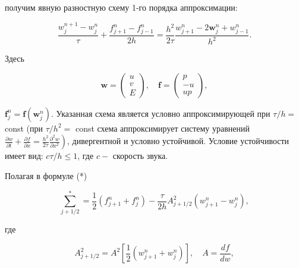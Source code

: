 \documentclass[10pt]{article}
\begin{document}
получим явную разностную схему 1-го порядка аппроксимации:



\[

\frac{w_{j}^{n+1}-w_{j}^{n}}{\tau}+\frac{f_{j+1}^{n}-f_{j-1}^{n}}{2 h}=\frac{h^{2}}{2 \tau} \frac{w_{j+1}^{n}-2 \boldsymbol{w}_{j}^{n}+w_{j-1}^{n}}{h^{2}} .

\]



Здесь



\[

\boldsymbol{w}=\left(\begin{array}{c}

u \\

v \\

E

\end{array}\right), \quad \boldsymbol{f}=\left(\begin{array}{c}

p \\

-u \\

u p

\end{array}\right),

\]



$\boldsymbol{f}_{j}^{n}=\boldsymbol{f}\left(\boldsymbol{w}_{j}^{n}\right)$. Указанная схема является условно аппроксимирующей при $\tau / h=$ const (при $\tau / h^{2}=$ const схема аппроксимирует систему уравнений $\left.\frac{\partial w}{\partial t}+\frac{\partial f}{\partial x}=\frac{h^{2}}{2 \tau} \frac{\partial^{2} w}{\partial x^{2}}\right)$, дивергентной и условно устойчивой. Условие устойчивости имеет вид: $c \tau / h \leqslant 1$, где $c-$ скорость звука.



Полагая в формуле (*)



\[

\sum_{j+1 / 2}^{*}=\frac{1}{2}\left(f_{j+1}^{n}+f_{j}^{n}\right)-\frac{\tau}{2 h} A_{j+1 / 2}^{2}\left(w_{j+1}^{n}-w_{j}^{n}\right),

\]



где



\[

A_{j+1 / 2}^{2}=A^{2}\left[\frac{1}{2}\left(w_{j+1}^{n}+w_{j}^{n}\right)\right], \quad A=\frac{d f}{d w},

\]
\end{document}
